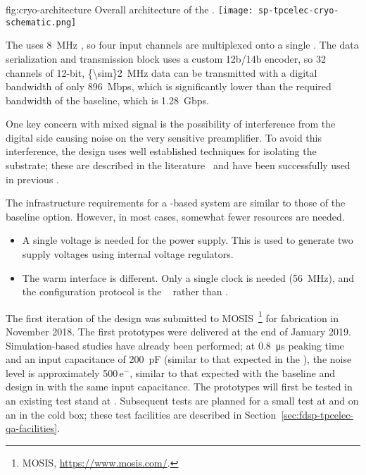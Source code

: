\begin{dunefigure}
{fig:cryo-architecture}
{Overall architecture of the  .}
\texttt{[image: sp-tpcelec-cryo-schematic.png]}
\end{dunefigure}

The  uses \SI{8}{MHz} , so four input channels are 
multiplexed onto a single . The data serialization and transmission 
block uses a custom 12b/14b encoder, so \num{32} channels of \num{12}-bit, 
\SI{{\sim}2}{MHz} data can be transmitted with a digital bandwidth of 
only \SI{896}{Mbps}, which is significantly lower %
than the required bandwidth 
of the baseline, which is \SI{1.28}{Gbps}.

One key concern with mixed signal  is the possibility of 
interference from the digital side causing noise on the very sensitive 
preamplifier. To avoid this interference, the  design 
uses well established techniques for isolating the substrate; these are 
described in the literature~\cite{yeh} and %
have been successfully 
used in previous .

The infrastructure requirements for a  -based 
system are similar to those of the baseline option. However, in most 
cases, somewhat fewer resources are needed.
\begin{itemize}
\item{A single voltage is needed for the power supply. This is used to 
generate two supply voltages using internal voltage regulators.}
\item{The warm interface is different. Only a single clock is 
needed (\SI{56}{MHz}), and the configuration protocol is the 
~\cite{SACI} rather than .}
\end{itemize}

The first iteration of the   design was 
submitted to MOSIS~\footnote{MOSIS\texttrademark{}, \url{https://www.mosis.com/}.} for fabrication in November 2018.  
The first prototypes were delivered at the end of January 2019. Simulation-based 
studies have already been performed; at \SI{0.8}{\micro\second} peaking 
time and an input capacitance of \SI{200}{pF} (similar to that expected 
in the ), the noise level is approximately 
\num{500}\,e$^-$, similar to that expected with the 
baseline  and   design in  
with the same input capacitance.  The prototypes will first be tested in an existing 
test stand at . Subsequent tests are planned for a small test 
 at  and on an  in the  
cold box; these test facilities are described in 
Section~\ref{sec:fdsp-tpcelec-qa-facilities}.

